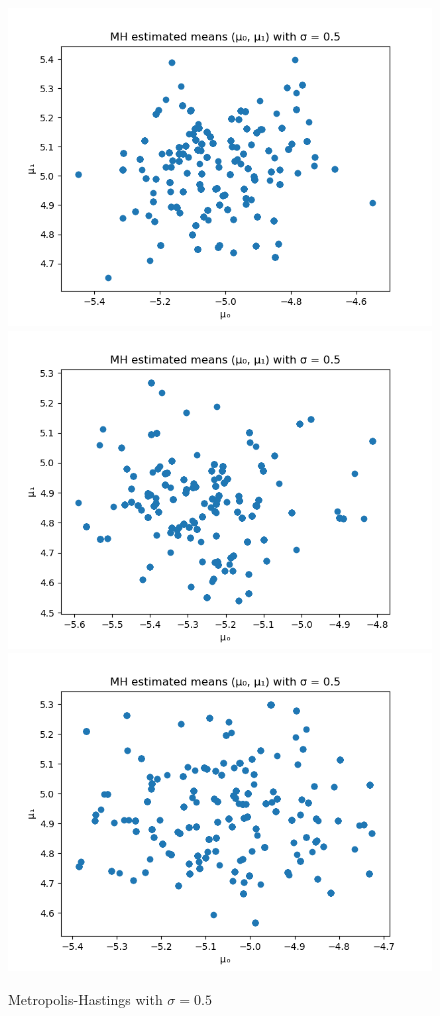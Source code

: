 \begin{figure}
	\includegraphics[scale=0.5]{mh-estimated-means-with-sigma-05-4.png}
	\includegraphics[scale=0.5]{mh-estimated-means-with-sigma-05-5.png}
	\includegraphics[scale=0.5]{mh-estimated-means-with-sigma-05-6.png}
	\caption{Metropolis-Hastings with $\sigma = 0.5$}
	\label{mh-figure-05}
\end{figure}

